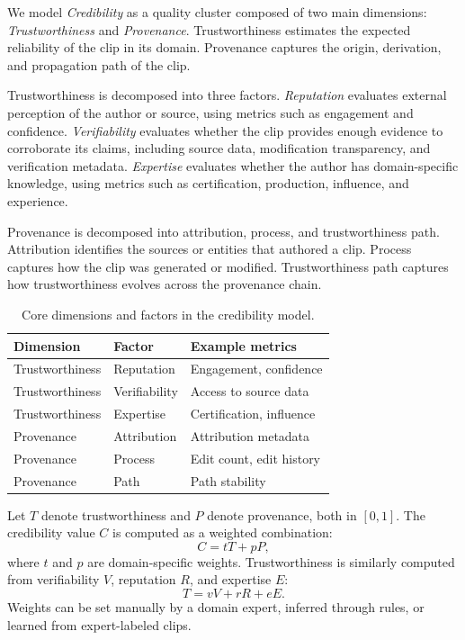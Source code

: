 \documentclass[sigconf, nonacm]{acmart}
\begin{document}
We model \emph{Credibility} as a quality cluster composed of two main dimensions:
\emph{Trustworthiness} and \emph{Provenance}. Trustworthiness estimates the
expected reliability of the clip in its domain. Provenance captures the origin,
derivation, and propagation path of the clip.

Trustworthiness is decomposed into three factors. \emph{Reputation} evaluates
external perception of the author or source, using metrics such as engagement and
confidence. \emph{Verifiability} evaluates whether the clip provides enough
evidence to corroborate its claims, including source data, modification
transparency, and verification metadata. \emph{Expertise} evaluates whether the
author has domain-specific knowledge, using metrics such as certification,
production, influence, and experience.

Provenance is decomposed into attribution, process, and trustworthiness path.
Attribution identifies the sources or entities that authored a clip. Process
captures how the clip was generated or modified. Trustworthiness path captures
how trustworthiness evolves across the provenance chain.

\begin{table}[t]
  \caption{Core dimensions and factors in the credibility model.}
  \label{tab:model}
  \begin{tabular}{lll}
    \toprule
    Dimension & Factor & Example metrics\\
    \midrule
    Trustworthiness & Reputation & Engagement, confidence\\
    Trustworthiness & Verifiability & Access to source data\\
    Trustworthiness & Expertise & Certification, influence\\
    Provenance & Attribution & Attribution metadata\\
    Provenance & Process & Edit count, edit history\\
    Provenance & Path & Path stability\\
    \bottomrule
  \end{tabular}
\end{table}

Let $T$ denote trustworthiness and $P$ denote provenance, both in $[0,1]$. The
credibility value $C$ is computed as a weighted combination:
\begin{equation}
  C = tT + pP,
\end{equation}
where $t$ and $p$ are domain-specific weights. Trustworthiness is similarly
computed from verifiability $V$, reputation $R$, and expertise $E$:
\begin{equation}
  T = vV + rR + eE.
\end{equation}
Weights can be set manually by a domain expert, inferred through rules, or learned
from expert-labeled clips.
\end{document}
